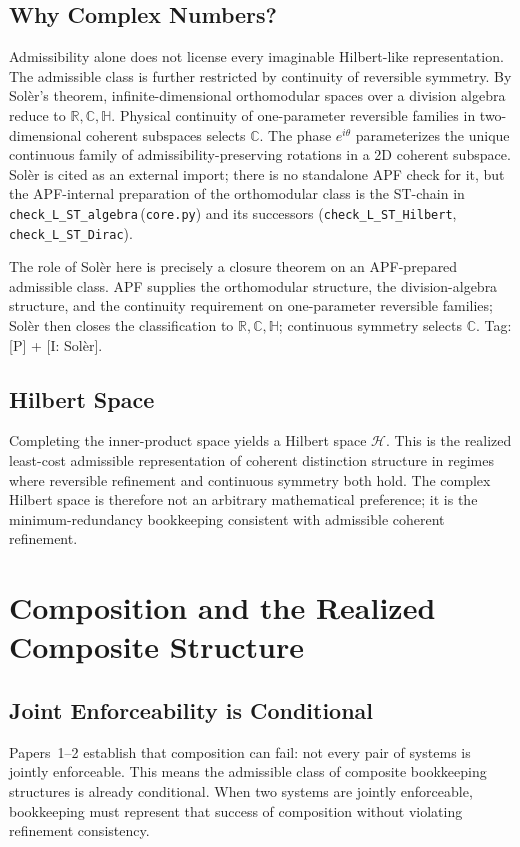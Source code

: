 \documentclass[11pt]{article}
\newcommand{\coderef}[2]{\texttt{#1}\,(\texttt{#2})}
\begin{document}
\subsection{Why Complex Numbers?}
Admissibility alone does not license every imaginable Hilbert-like representation.
The admissible class is further restricted by continuity of reversible symmetry.
By Sol\`er's theorem, infinite-dimensional orthomodular spaces over a division
algebra reduce to $\mathbb{R}, \mathbb{C}, \mathbb{H}$. Physical continuity of
one-parameter reversible families in two-dimensional coherent subspaces selects
$\mathbb{C}$. The phase $e^{i\theta}$ parameterizes the unique continuous family
of admissibility-preserving rotations in a 2D coherent subspace. Sol\`er is cited
as an external import; there is no standalone APF check for it, but the
APF-internal preparation of the orthomodular class is the ST-chain in
\coderef{check\_L\_ST\_algebra}{core.py} and its successors (\texttt{check\_L\_ST\_Hilbert},
\texttt{check\_L\_ST\_Dirac}).

\begin{bridgebox}
The role of Sol\`er here is precisely a closure theorem on an APF-prepared
admissible class. APF supplies the orthomodular structure, the division-algebra
structure, and the continuity requirement on one-parameter reversible families;
Sol\`er then closes the classification to $\mathbb{R}, \mathbb{C}, \mathbb{H}$;
continuous symmetry selects $\mathbb{C}$. Tag: [P] + [I: Sol\`er].
\end{bridgebox}

\subsection{Hilbert Space}
Completing the inner-product space yields a Hilbert space $\mathcal{H}$. This is
the realized least-cost admissible representation of coherent distinction
structure in regimes where reversible refinement and continuous symmetry both
hold. The complex Hilbert space is therefore not an arbitrary mathematical
preference; it is the minimum-redundancy bookkeeping consistent with admissible
coherent refinement.

\section{Composition and the Realized Composite Structure}\label{sec:tensor}

\subsection{Joint Enforceability is Conditional}
Papers~1--2 establish that composition can fail: not every pair of systems is
jointly enforceable. This means the admissible class of composite bookkeeping
structures is already conditional. When two systems are jointly enforceable,
bookkeeping must represent that success of composition without violating
refinement consistency.
\end{document}
